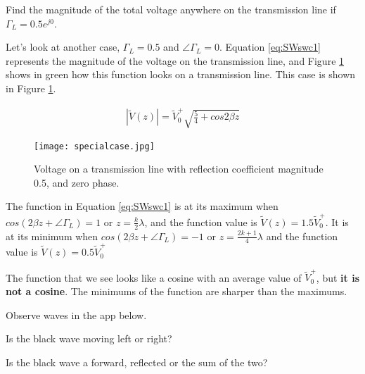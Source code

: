 \documentclass{ximera}
\begin{document}
\begin{example}

Find the magnitude of the total voltage anywhere on the transmission line if $\Gamma_L=0.5 e^{j0}$.

\begin{explanation}
Let's look at another case,  $\Gamma_L=0.5$ and $\angle \Gamma_L=0$. Equation \ref{eq:SWswc1}  represents the magnitude of the voltage on the transmission line, and Figure \ref{fig:SWreflcoeffvid} shows in green how this function looks on a transmission line. This case is shown in Figure \ref{fig:SWreflcoeffvid}. 

\begin{eqnarray}
|\tilde{V}(z)|=\tilde{V}_0^+ \sqrt{\frac{5}{4}+ cos{2 \beta z} }\label{eq:SWswc1}
\end{eqnarray}

\begin{figure}[htbp]
\begin{center}
\texttt{[image: specialcase.jpg]}
\end{center}
\caption{Voltage on a transmission line with reflection coefficient magnitude 0.5, and zero phase.}
\label{fig:SWreflcoeffvid}
\end{figure}



The function in Equation \ref{eq:SWswc1} is at its maximum 
when $cos(2 \beta z+\angle \Gamma_L)=1$ or $z=\frac{k}{2} \lambda$, and the function
value is $\tilde{V}(z)=1.5\tilde{V}_0^+  $. It is at its
minimum when  $cos(2 \beta z+ \angle \Gamma_L)=-1$ or $z=\frac{2 k +1}{4} \lambda$
and the function value is $\tilde{V}(z)=0.5 \tilde{V}_0^+$

The function that we see looks
like a cosine with an average value of $ \tilde{V}_0^+ $, but {\bf it is not a cosine}.
The minimums of the function are sharper than the maximums. 



\end{explanation}
\end{example}



\begin{question}

Observe waves in the app below. 


\begin{center}  
\end{center} 


Is the black wave moving left or right? 

\begin{multipleChoice}  
\end{multipleChoice}  


Is the black wave a forward, reflected or the sum of the two?
\begin{multipleChoice}  
\end{multipleChoice}  

\end{question}
\end{document}
